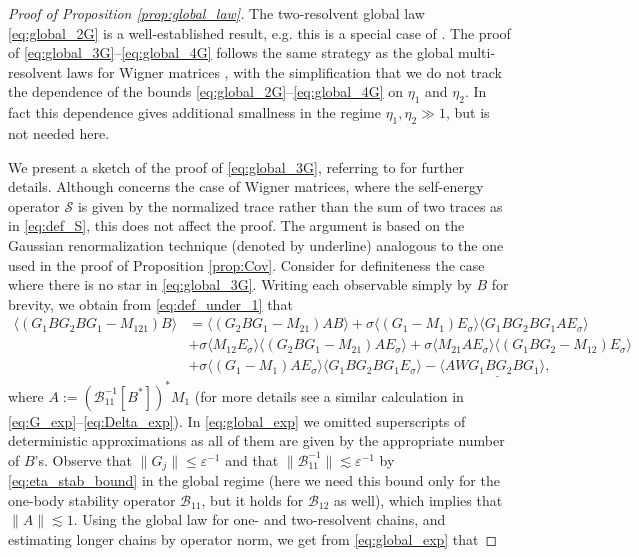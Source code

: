 \documentclass[10pt]{amsart}
\numberwithin{equation}{section}
\begin{document}
\begin{proof}[Proof of Proposition \ref{prop:global_law}] The two-resolvent global law \eqref{eq:global_2G} is a well-established result, e.g. this is a special case of \cite[Theorem 5.2]{macroCLT_complex}. The proof of \eqref{eq:global_3G}--\eqref{eq:global_4G} follows the same strategy as the global multi-resolvent laws for Wigner matrices \cite[Appendix B]{Multi_res_llaws}, with the simplification that we do not track the dependence of the bounds \eqref{eq:global_2G}--\eqref{eq:global_4G} on $\eta_1$ and $\eta_2$. In fact this dependence gives additional smallness in the regime $\eta_1,\eta_2\gg 1$, but is not needed here. 


We present a sketch of the proof of \eqref{eq:global_3G}, referring to \cite[Appendix B]{Multi_res_llaws} for further details. Although \cite{Multi_res_llaws} concerns the case of Wigner matrices, where the self-energy operator $\mathcal{S}$ is given by the normalized trace rather than the sum of two traces as in \eqref{eq:def_S}, this does not affect the proof. The argument is based on the Gaussian renormalization technique (denoted by underline) analogous to the one used in the proof of Proposition \ref{prop:Cov}. Consider for definiteness the case where there is no star in \eqref{eq:global_3G}. Writing each observable simply by $B$ for brevity, we obtain from \eqref{eq:def_under_1} that
\begin{equation}
\begin{split}
\langle (G_1BG_2BG_1-M_{121})B\rangle &= \langle (G_2BG_1-M_{21})AB\rangle + \sigma \langle (G_1-M_1)E_\sigma\rangle \langle G_1BG_2BG_1AE_\sigma\rangle\\
& +\sigma \langle M_{12}E_\sigma\rangle \langle (G_2BG_1-M_{21})AE_\sigma\rangle+\sigma \langle M_{21}AE_\sigma\rangle \langle (G_1BG_2-M_{12})E_\sigma\rangle\\
&+ \sigma\langle (G_1-M_1)AE_\sigma\rangle\langle G_1BG_2BG_1E_\sigma\rangle - \langle A\underline{WG_1BG_2BG_1}\rangle,
\end{split}
\label{eq:global_exp}
\end{equation}
where $A:=(\mathcal{B}_{11}^{-1}[B^*])^*M_1$ (for more details see a similar calculation in \eqref{eq:G_exp}--\eqref{eq:Delta_exp}). In \eqref{eq:global_exp} we omitted superscripts of deterministic approximations as all of them are given by the appropriate number of $B$'s. Observe that $\|G_j\|\le \varepsilon^{-1}$ and that $\|\mathcal{B}_{11}^{-1}\|\lesssim \varepsilon^{-1}$ by \eqref{eq:eta_stab_bound} in the global regime (here we need this bound only for the one-body stability operator $\mathcal{B}_{11}$, but it holds for $\mathcal{B}_{12}$ as well), which implies that $\|A\|\lesssim 1$. Using the global law for one- and two-resolvent chains, and estimating longer chains by operator norm, we get from \eqref{eq:global_exp} that

\end{proof}
\end{document}
